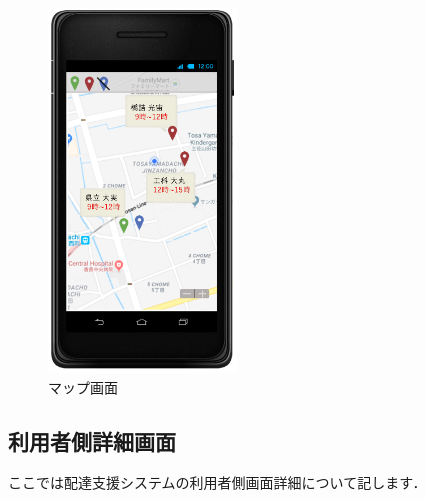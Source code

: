 \documentclass[a4j,titlepage]{jarticle}
\begin{document}
\begin{figure}[H]
 \begin{center}
  \includegraphics[width=50mm]{map.png}
	\caption{マップ画面}
	\label{fig:map}
 \end{center}

\end{figure}

\newpage

\subsection{利用者側詳細画面}
ここでは配達支援システムの利用者側画面詳細について記します．
\end{document}
